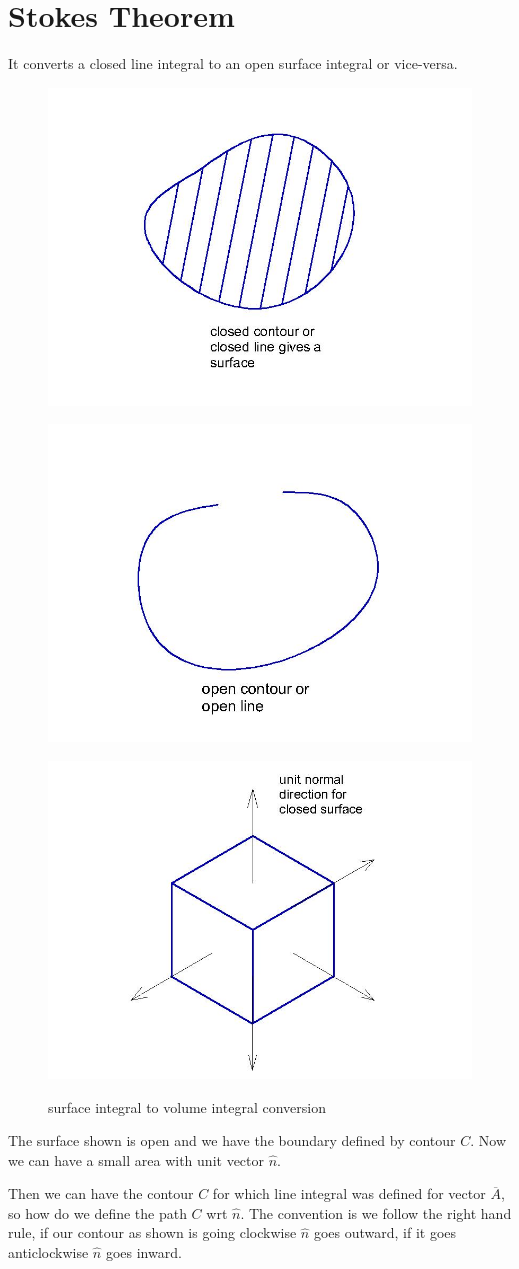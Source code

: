 \section{Stokes Theorem}
It converts a closed line integral to an open surface integral or vice-versa. 
\begin{figure}[h]
\centering
\begin{minipage}{.25\textwidth}
\centering
\includegraphics[width=.4\linewidth]{./graphics/fig176}
\label{fig:fig176}
\end{minipage}%
\begin{minipage}{.25\textwidth}
\centering
\includegraphics[width=.4\linewidth]{./graphics/fig176b}
\label{fig:fig176b}
\end{minipage}
\begin{minipage}{.5\textwidth}
\centering
\includegraphics[width=.4\linewidth]{./graphics/fig176c}
\label{fig:fig176c}
\end{minipage}%
\caption{surface integral to volume integral conversion}
\end{figure}

The surface shown is open and we have the boundary defined by contour $C$. Now we can have a small area with unit vector $\hat n$.

Then we can have the contour $C$ for which line integral was defined for vector $\overline{A}$, so how do we define the path $C$ wrt $\hat n$. The convention is we follow the right hand rule, if our contour as shown is going clockwise $\hat n$ goes outward, if it goes anticlockwise $\hat n$ goes inward.

